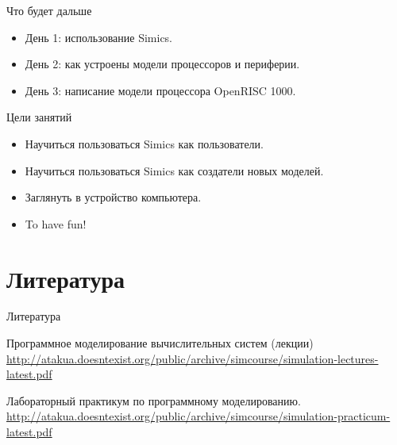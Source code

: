 \documentclass{beamer}
\begin{document}
\begin{frame}{Что будет дальше}
\begin{itemize}
\item День 1: использование Simics.
\item День 2: как устроены модели процессоров и периферии.
\item День 3: написание модели процессора OpenRISC 1000.
\end{itemize}
\end{frame}

\begin{frame}{Цели занятий}
\begin{itemize}
\item Научиться пользоваться Simics как пользователи.\pause
\item Научиться пользоваться Simics как создатели новых моделей.\pause
\item Заглянуть в устройство компьютера.\pause
\item To have fun!
\end{itemize}

\end{frame}


\section{Литература}

\begin{frame}[allowframebreaks]{Литература}
\begin{thebibliography}{99}
     Программное моделирование вычислительных систем (лекции) \url{http://atakua.doesntexist.org/public/archive/simcourse/simulation-lectures-latest.pdf}
	
	 Лабораторный практикум по программному моделированию.  \url{http://atakua.doesntexist.org/public/archive/simcourse/simulation-practicum-latest.pdf}

\end{thebibliography}
\end{frame}
\end{document}
